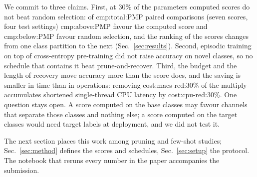 We commit to three claims. First, at $30\%$ of the parameters computed scores do not beat random selection: of \num{cmp:total:PMP} paired comparisons (seven scores, four test settings) \num{cmp:above:PMP} favour the computed score and \num{cmp:below:PMP} favour random selection, and the ranking of the scores changes from one class partition to the next (Sec.~\ref{sec:results}). Second, episodic training on top of cross-entropy pre-training did not raise accuracy on novel classes, so no schedule that contains it beat prune-and-recover. Third, the budget and the length of recovery move accuracy more than the score does, and the saving is smaller in time than in operations: removing \num{cost:macs-red:30}\% of the multiply-accumulates shortened single-thread CPU latency by \num{cost:cpu-red:30}\%. One question stays open. A score computed on the base classes may favour channels that separate those classes and nothing else; a score computed on the target classes would need target labels at deployment, and we did not test it.

The next section places this work among pruning and few-shot studies; Sec.~\ref{sec:method} defines the scores and schedules, Sec.~\ref{sec:setup} the protocol. The notebook that reruns every number in the paper accompanies the submission.
